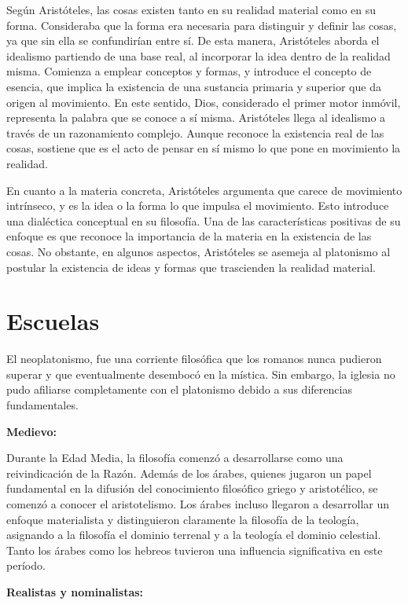 \documentclass[
  letterpaper,
  DIV=11,
  numbers=noendperiod]{scrartcl}
\begin{document}
Según Aristóteles, las cosas existen tanto en su realidad material como
en su forma. Consideraba que la forma era necesaria para distinguir y
definir las cosas, ya que sin ella se confundirían entre sí. De esta
manera, Aristóteles aborda el idealismo partiendo de una base real, al
incorporar la idea dentro de la realidad misma. Comienza a emplear
conceptos y formas, y introduce el concepto de esencia, que implica la
existencia de una sustancia primaria y superior que da origen al
movimiento. En este sentido, Dios, considerado el primer motor inmóvil,
representa la palabra que se conoce a sí misma. Aristóteles llega al
idealismo a través de un razonamiento complejo. Aunque reconoce la
existencia real de las cosas, sostiene que es el acto de pensar en sí
mismo lo que pone en movimiento la realidad.

En cuanto a la materia concreta, Aristóteles argumenta que carece de
movimiento intrínseco, y es la idea o la forma lo que impulsa el
movimiento. Esto introduce una dialéctica conceptual en su filosofía.
Una de las características positivas de su enfoque es que reconoce la
importancia de la materia en la existencia de las cosas. No obstante, en
algunos aspectos, Aristóteles se asemeja al platonismo al postular la
existencia de ideas y formas que trascienden la realidad material.

\hypertarget{escuelas}{%
\section{Escuelas}\label{escuelas}}

El neoplatonismo, fue una corriente filosófica que los romanos nunca
pudieron superar y que eventualmente desembocó en la mística. Sin
embargo, la iglesia no pudo afiliarse completamente con el platonismo
debido a sus diferencias fundamentales.

\textbf{Medievo:}

Durante la Edad Media, la filosofía comenzó a desarrollarse como una
reivindicación de la Razón. Además de los árabes, quienes jugaron un
papel fundamental en la difusión del conocimiento filosófico griego y
aristotélico, se comenzó a conocer el aristotelismo. Los árabes incluso
llegaron a desarrollar un enfoque materialista y distinguieron
claramente la filosofía de la teología, asignando a la filosofía el
dominio terrenal y a la teología el dominio celestial. Tanto los árabes
como los hebreos tuvieron una influencia significativa en este período.

\textbf{Realistas y nominalistas:}
\end{document}
